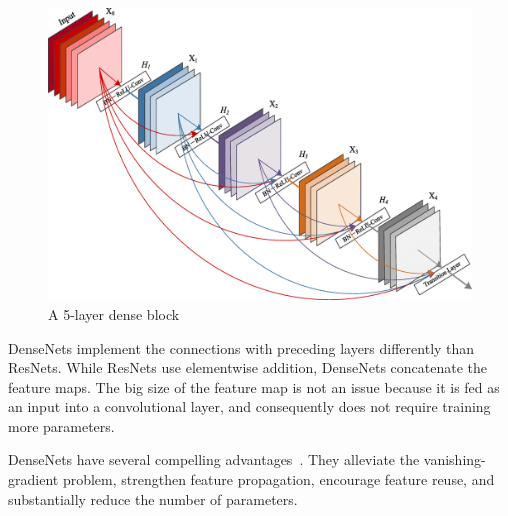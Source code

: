 \begin{figure}[H]
    \centering
    \includegraphics[width=0.9\columnwidth]{images/face-recognition/densenet.png}
    \caption{A 5-layer dense block~\cite{DenseNet}}
    \label{fig:DenseNet}
\end{figure}

DenseNets implement the connections with preceding layers differently than ResNets.
While ResNets use elementwise addition, DenseNets concatenate the feature maps.
The big size of the feature map is not an issue because it is fed as an input into a convolutional layer,
and consequently does not require training more parameters.

DenseNets have several compelling advantages~\cite{DenseNet}.
They alleviate the vanishing-gradient problem, strengthen feature propagation, encourage feature reuse, and
substantially reduce the number of parameters.